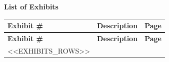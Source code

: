 \documentclass[12pt,letterpaper]{article}
\begin{document}
\begin{center}
\Large\textbf{List of Exhibits}
\end{center}

\vspace{1em}

\begin{longtable}{|p{2.5cm}|p{10cm}|p{2cm}|}
\hline
\textbf{Exhibit \#} & \textbf{Description} & \textbf{Page} \\
\hline
\endfirsthead

\hline
\textbf{Exhibit \#} & \textbf{Description} & \textbf{Page} \\
\hline
\endhead

\hline
\endfoot

\hline
\endlastfoot

<<EXHIBITS_ROWS>>

\end{longtable}
\end{document}
